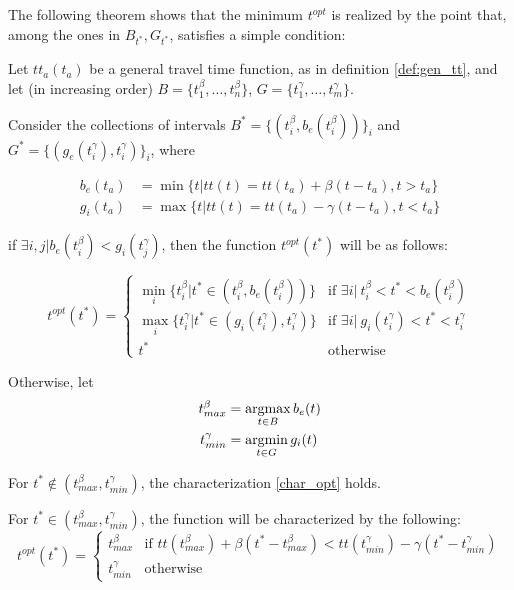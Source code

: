 The following theorem shows that the minimum \(t^{opt}\) is realized by the point that,
among the ones in \(B_{t^*}, G_{t^*}\),
satisfies a simple condition:
\begin{theorem}
  \label{theo:characterization}
    Let \(tt_a(t_a)\) be a general travel time function, as in definition \ref{def:gen_tt},
  and let (in increasing order) \(B = \{t^\beta_1, \dots, t^\beta_n\}\), \(G = \{t^\gamma_1, \dots, t^\gamma_m\}\).


  Consider the collections of intervals \(B^* = \{(t^\beta_i, b_e(t^\beta_i))\}_i\) and \(G^* = \{(g_e(t^\gamma_i), t^\gamma_i)\}_i\), where

  \begin{align*}
    b_e(t_a) & = \min\{t | tt(t) = tt(t_a) + \beta(t - t_a), t > t_a\} \\
    g_i(t_a) & = \max\{t | tt(t) = tt(t_a) - \gamma(t - t_a), t < t_a\}
  \end{align*}
  
  if \(\exists i, j |b_e(t^\beta_i) < g_i(t^\gamma_j)\), then the function \(t^{opt}(t^*)\) will be as follows:

  \begin{equation}
    \label{char_opt}
    t^{opt}(t^*) = 
    \begin{cases}
      \min_i \{t^\beta_i | t^* \in (t^\beta_i, b_e(t^\beta_i))\} & \text{if } \exists i |\ t^\beta_i < t^* < b_e(t^\beta_i) \\
      \max_i \{t^\gamma_i | t^* \in (g_i(t^\gamma_i), t^\gamma_i)\} & \text{if } \exists i |\ g_i(t^\gamma_i) < t^* < t^\gamma_i \\
      t^* & \text{otherwise}
    \end{cases}
  \end{equation}

  Otherwise, let
  \begin{align*}
    t^\beta_{max} & = \operatorname*{argmax}_{t \in B}b_e(t) \\
    t^\gamma_{min} & = \operatorname*{argmin}_{t \in G}g_i(t)
  \end{align*}

  For \(t^* \notin (t^\beta_{max}, t^\gamma_{min})\), the characterization \eqref{char_opt} holds.

  For \(t^* \in (t^\beta_{max}, t^\gamma_{min})\), the function will be characterized by the following:
  \begin{equation}
    \label{eq:char_strange}
    t^{opt}(t^*) =
    \begin{cases}
      t^\beta_{max} & \text{if } tt(t^\beta_{max}) + \beta(t^* - t^\beta_{max}) < tt(t^\gamma_{min}) - \gamma(t^* - t^\gamma_{min}) \\
      t^\gamma_{min} & \text{otherwise}
    \end{cases}
  \end{equation}
\end{theorem}

